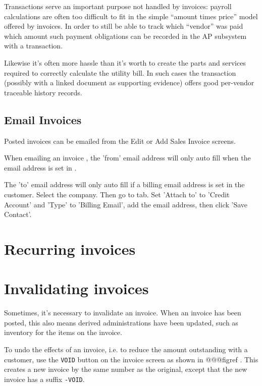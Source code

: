 Transactions serve an important purpose not handled by invoices: payroll
calculations are often too difficult to fit in the simple ``amount times price''
model offered by invoices. In order to still be able to track which ``vendor''
was paid which amount such payment obligations can be recorded in the AP subsystem
with a transaction.

Likewise it's often more hassle than it's worth to create the parts and services
required to correctly calculate the utility bill. In such cases the transaction
(possibly with a linked document as supporting evidence) offers good per-vendor
traceable history records.


\subsection{Email Invoices}
\label{subsec-business-processes-invoicing-manual-entry-email}

Posted invoices can be emailed from the Edit or Add Sales Invoice screens.

When emailing an invoice , the 'from' email  address will only auto fill when the email address is set in
.

The 'to' email address will only auto fill if a billing email address is set in the customer.
Select the company. Then go to  tab. Set 'Attach to'  to  'Credit Account' and 'Type'  to 'Billing Email', add the email address, then click 'Save Contact'.

\section{Recurring invoices}
\label{sec-business-processes-invoicing-recurring}


\section{Invalidating invoices}
\label{sec-business-processes-invoicing-invalidation}

Sometimes, it's necessary to invalidate an invoice. When an invoice has been
posted, this also means derived administrations have been updated, such as
inventory for the items on the invoice.

To undo the effects of an invoice, i.e. to reduce the amount outstanding with a
\gls{customer}, use the \texttt{VOID} button on the invoice screen as shown in @@@figref .
This creates a new invoice by the same number as the original, except that the new
invoice has a suffix \texttt{-VOID}.

